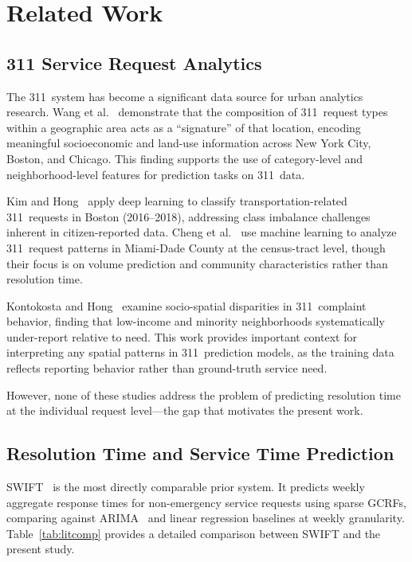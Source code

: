 \documentclass[sigconf,nonacm]{acmart}
\begin{document}
\section{Related Work}
\label{sec:related}

\subsection{311 Service Request Analytics}

The 311~system has become a significant data source for urban
analytics research. Wang et al.~\cite{wang2017structure311}
demonstrate that the composition of 311~request types within a
geographic area acts as a ``signature'' of that location,
encoding meaningful socioeconomic and land-use information across
New York City, Boston, and Chicago. This finding supports the use
of category-level and neighborhood-level features for prediction
tasks on 311~data.

Kim and Hong~\cite{kim2021classification311} apply deep learning
to classify transportation-related 311~requests in Boston
(2016--2018), addressing class imbalance challenges inherent in
citizen-reported data. Cheng et al.~\cite{cheng2022311ml} use
machine learning to analyze 311~request patterns in Miami-Dade
County at the census-tract level, though their focus is on volume
prediction and community characteristics rather than resolution
time.

Kontokosta and Hong~\cite{kontokosta2021bias} examine
socio-spatial disparities in 311~complaint behavior, finding that
low-income and minority neighborhoods systematically under-report
relative to need. This work provides important context for
interpreting any spatial patterns in 311~prediction models, as
the training data reflects reporting behavior rather than
ground-truth service need.

However, none of these studies address the problem of predicting
resolution time at the individual request level---the gap that
motivates the present work.

\subsection{Resolution Time and Service Time Prediction}

SWIFT~\cite{raj2021swift} is the most directly comparable prior
system. It predicts weekly aggregate response times for
non-emergency service requests using sparse GCRFs, comparing
against ARIMA~\cite{box1970arima} and linear regression baselines
at weekly granularity. Table~\ref{tab:litcomp} provides a
detailed comparison between SWIFT and the present study.
\end{document}
